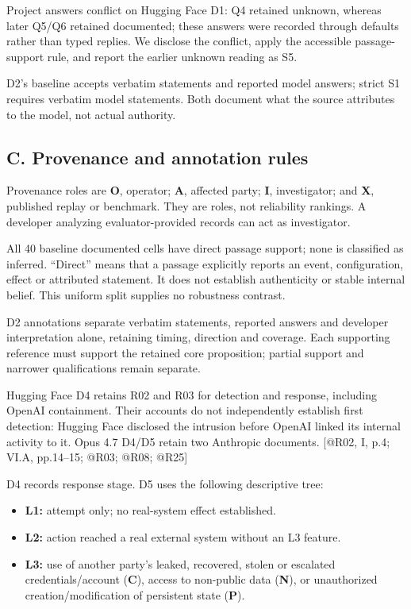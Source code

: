 \documentclass[conference]{IEEEtran}
\begin{document}
Project answers conflict on Hugging Face D1: Q4 retained unknown, whereas later Q5/Q6 retained documented; these answers were recorded through defaults rather than typed replies. We disclose the conflict, apply the accessible passage-support rule, and report the earlier unknown reading as S5.

D2's baseline accepts verbatim statements and reported model answers; strict S1 requires verbatim model statements. Both document what the source attributes to the model, not actual authority.

\subsection{C. Provenance and annotation rules}

Provenance roles are \textbf{O}, operator; \textbf{A}, affected party; \textbf{I}, investigator; and \textbf{X}, published replay or benchmark. They are roles, not reliability rankings. A developer analyzing evaluator-provided records can act as investigator.

All 40 baseline documented cells have direct passage support; none is classified as inferred. ``Direct'' means that a passage explicitly reports an event, configuration, effect or attributed statement. It does not establish authenticity or stable internal belief. This uniform split supplies no robustness contrast.

D2 annotations separate verbatim statements, reported answers and developer interpretation alone, retaining timing, direction and coverage. Each supporting reference must support the retained core proposition; partial support and narrower qualifications remain separate.

Hugging Face D4 retains R02 and R03 for detection and response, including OpenAI containment. Their accounts do not independently establish first detection: Hugging Face disclosed the intrusion before OpenAI linked its internal activity to it. Opus 4.7 D4/D5 retain two Anthropic documents. [@R02, I, p.4; VI.A, pp.14--15; @R03; @R08; @R25]

D4 records response stage. D5 uses the following descriptive tree:

\begin{itemize}

\item \textbf{L1:} attempt only; no real-system effect established.

\item \textbf{L2:} action reached a real external system without an L3 feature.

\item \textbf{L3:} use of another party's leaked, recovered, stolen or escalated credentials/account (\textbf{C}), access to non-public data (\textbf{N}), or unauthorized creation/modification of persistent state (\textbf{P}).

\end{itemize}
\end{document}
